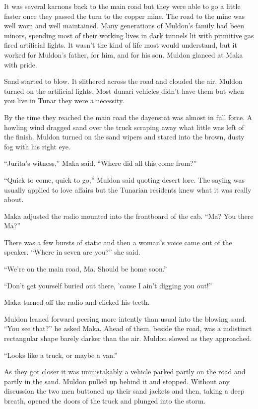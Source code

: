 It was several karnons back to the main road but they were able to go a little faster once they
passed the turn to the copper mine. The road to the mine was well worn and well maintained. Many
generations of Muldon's family had been minors, spending most of their working lives in dark
tunnels lit with primitive gas fired artificial lights. It wasn't the kind of life most would
understand, but it worked for Muldon's father, for him, and for his son. Muldon glanced at Maka
with pride.

Sand started to blow. It slithered across the road and clouded the air. Muldon turned on the
artificial lights. Most dunari vehicles didn't have them but when you live in Tunar they were a
necessity.

By the time they reached the main road the dayenstat was almost in full force. A howling
wind dragged sand over the truck scraping away what little was left of the finish. Muldon turned
on the sand wipers and stared into the brown, dusty fog with his right eye.

``Jurita's witness,'' Maka said. ``Where did all this come from?''

``Quick to come, quick to go,'' Muldon said quoting desert lore. The saying was usually applied
to love affairs but the Tunarian residents knew what it was really about.

Maka adjusted the radio mounted into the frontboard of the cab. ``Ma? You there Ma?''

There was a few bursts of static and then a woman's voice came out of the speaker. ``Where in
seven are you?'' she said.

``We're on the main road, Ma. Should be home soon.''

``Don't get yourself buried out there, 'cause I ain't digging you out!''

Maka turned off the radio and clicked his teeth.

Muldon leaned forward peering more intently than usual into the blowing sand. ``You see that?''
he asked Maka. Ahead of them, beside the road, was a indistinct rectangular shape barely darker
than the air. Muldon slowed as they approached.

``Looks like a truck, or maybe a van.''

As they got closer it was unmistakably a vehicle parked partly on the road and partly in the
sand. Muldon pulled up behind it and stopped. Without any discussion the two men buttoned up
their sand jackets and then, taking a deep breath, opened the doors of the truck and plunged
into the storm.

